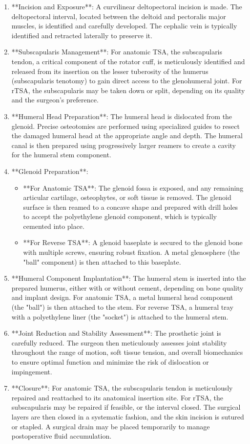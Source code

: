 \begin{enumerate}
  \item  **Incision and Exposure**: A curvilinear deltopectoral incision is made. The deltopectoral interval, located between the deltoid and pectoralis major muscles, is identified and carefully developed. The cephalic vein is typically identified and retracted laterally to preserve it.
  \item  **Subscapularis Management**: For anatomic TSA, the subscapularis tendon, a critical component of the rotator cuff, is meticulously identified and released from its insertion on the lesser tuberosity of the humerus (subscapularis tenotomy) to gain direct access to the glenohumeral joint. For rTSA, the subscapularis may be taken down or split, depending on its quality and the surgeon's preference.
  \item  **Humeral Head Preparation**: The humeral head is dislocated from the glenoid. Precise osteotomies are performed using specialized guides to resect the damaged humeral head at the appropriate angle and depth. The humeral canal is then prepared using progressively larger reamers to create a cavity for the humeral stem component.
  \item  **Glenoid Preparation**:
      \begin{itemize}
        \item   **For Anatomic TSA**: The glenoid fossa is exposed, and any remaining articular cartilage, osteophytes, or soft tissue is removed. The glenoid surface is then reamed to a concave shape and prepared with drill holes to accept the polyethylene glenoid component, which is typically cemented into place.
        \item   **For Reverse TSA**: A glenoid baseplate is secured to the glenoid bone with multiple screws, ensuring robust fixation. A metal glenosphere (the "ball" component) is then attached to this baseplate.
      \end{itemize}
  \item  **Humeral Component Implantation**: The humeral stem is inserted into the prepared humerus, either with or without cement, depending on bone quality and implant design. For anatomic TSA, a metal humeral head component (the "ball") is then attached to the stem. For reverse TSA, a humeral tray with a polyethylene liner (the "socket") is attached to the humeral stem.
  \item  **Joint Reduction and Stability Assessment**: The prosthetic joint is carefully reduced. The surgeon then meticulously assesses joint stability throughout the range of motion, soft tissue tension, and overall biomechanics to ensure optimal function and minimize the risk of dislocation or impingement.
  \item  **Closure**: For anatomic TSA, the subscapularis tendon is meticulously repaired and reattached to its anatomical insertion site. For rTSA, the subscapularis may be repaired if feasible, or the interval closed. The surgical layers are then closed in a systematic fashion, and the skin incision is sutured or stapled. A surgical drain may be placed temporarily to manage postoperative fluid accumulation.
\end{enumerate}

